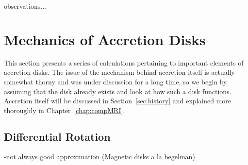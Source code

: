 observations...




\section{Mechanics of Accretion Disks}\label{sec:mechanics}
This section presents a series of calculations pertaining to important elements of accretion disks. The issue of the mechanism behind accretion itself is actually somewhat thorny and was under discussion for a long time, so we begin by assuming that the disk already exists and look at how such a disk functions. Accretion itself will be discussed in Section~\ref{sec:history} and explained more thoroughly in Chapter~\ref{chap:compMRI}. 


\subsection{Differential Rotation} \label{ssec:difrot}
-not always good approximation (Magnetic disks a la begelman)


